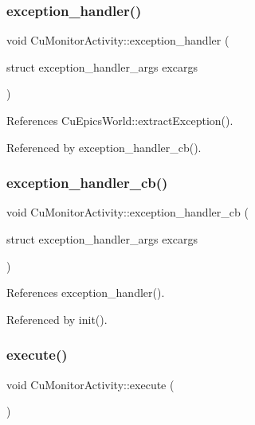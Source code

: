 \subsubsection{exception\+\_\+handler()}
{\footnotesize\ttfamily void Cu\+Monitor\+Activity\+::exception\+\_\+handler (\begin{DoxyParamCaption}\item[{struct exception\+\_\+handler\+\_\+args}]{excargs }\end{DoxyParamCaption})}



References Cu\+Epics\+World\+::extract\+Exception().



Referenced by exception\+\_\+handler\+\_\+cb().

\mbox{\label{classCuMonitorActivity_afc62496d0b4171ce99e073082e9b64da}} 
\subsubsection{exception\+\_\+handler\+\_\+cb()}
{\footnotesize\ttfamily void Cu\+Monitor\+Activity\+::exception\+\_\+handler\+\_\+cb (\begin{DoxyParamCaption}\item[{struct exception\+\_\+handler\+\_\+args}]{excargs }\end{DoxyParamCaption})\hspace{0.3cm}{\ttfamily [static]}}



References exception\+\_\+handler().



Referenced by init().

\mbox{\label{classCuMonitorActivity_aa639f58d03ad3b91cea5ab9b4f5319ee}} 
\subsubsection{execute()}
{\footnotesize\ttfamily void Cu\+Monitor\+Activity\+::execute (\begin{DoxyParamCaption}{ }\end{DoxyParamCaption})\hspace{0.3cm}{\ttfamily [protected]}}



